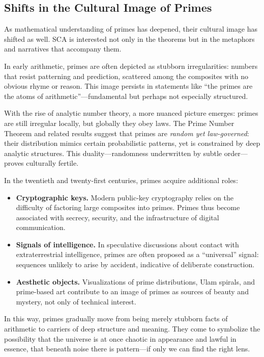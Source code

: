 \documentclass[12]{amsart}
\theoremstyle{plain}
\begin{document}
\subsection{Shifts in the Cultural Image of Primes}

As mathematical understanding of primes has deepened, their cultural image has shifted as well. SCA is interested not only in the theorems but in the metaphors and narratives that accompany them.

In early arithmetic, primes are often depicted as stubborn irregularities: numbers that resist patterning and prediction, scattered among the composites with no obvious rhyme or reason. This image persists in statements like ``the primes are the atoms of arithmetic''—fundamental but perhaps not especially structured.

With the rise of analytic number theory, a more nuanced picture emerges: primes are still irregular locally, but globally they obey laws. The Prime Number Theorem and related results suggest that primes are \emph{random yet law-governed}: their distribution mimics certain probabilistic patterns, yet is constrained by deep analytic structures. This duality—randomness underwritten by subtle order—proves culturally fertile.

In the twentieth and twenty-first centuries, primes acquire additional roles:

\begin{itemize}
  \item \textbf{Cryptographic keys.} Modern public-key cryptography relies on the difficulty of factoring large composites into primes. Primes thus become associated with secrecy, security, and the infrastructure of digital communication.
  \item \textbf{Signals of intelligence.} In speculative discussions about contact with extraterrestrial intelligence, primes are often proposed as a ``universal'' signal: sequences unlikely to arise by accident, indicative of deliberate construction.
  \item \textbf{Aesthetic objects.} Visualizations of prime distributions, Ulam spirals, and prime-based art contribute to an image of primes as sources of beauty and mystery, not only of technical interest.
\end{itemize}

In this way, primes gradually move from being merely stubborn facts of arithmetic to carriers of deep structure and meaning. They come to symbolize the possibility that the universe is at once chaotic in appearance and lawful in essence, that beneath noise there is pattern—if only we can find the right lens.
\end{document}
